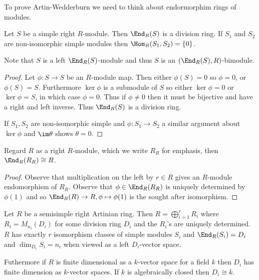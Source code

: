 \documentclass[a4paper]{article}
\begin{document}
To prove Artin-Wedderburn we need to think about endormorphim rings of modules.

\begin{lemma}
  Let \(S\) be a simple right \(R\)-module. Then \(\End_R(S)\) is a division ring. If \(S_1\) and \(S_2\) are non-isomorphic simple modules then \(\Hom_R(S_1, S_2) = \{0\}\).
\end{lemma}

Note that \(S\) is a left \(\End_R(S)\)-module and thus \(S\) is an \((\End_R(S), R)\)-bimodule.

\begin{proof}
  Let \(\phi: S \to S\) be an \(R\)-module map. Then either \(\phi(S) = 0\) so \(\phi = 0\), or \(\phi(S) = S\). Furthermore \(\ker \phi\) is a submodule of \(S\) so either \(\ker \phi = 0\) or \(\ker \phi = S\), in which case \(\phi = 0\). Thus if \(\phi \neq 0\) then it must be bijective and have a right and left inverse. Thus \(\End_R(S)\) is a division ring.

  If \(S_1, S_2\) are non-isomorphic simple and \(\phi: S_1 \to S_2\) a similar argument about \(\ker \phi\) and \(\im \theta\) shows \(\theta = 0\).
\end{proof}

\begin{lemma}
  Regard \(R\) as a right \(R\)-module, which we write \(R_R\) for emphasis, then \(\End_R(R_R) \cong R\).
\end{lemma}

\begin{proof}
  Observe that multiplication on the left by \(r \in R\) gives an \(R\)-module endomorphism of \(R_R\). Observe that \(\phi \in \End_R(R_R)\) is uniquely determined by \(\phi(1)\) and so \(\End_R(R) \to R, \phi \mapsto \phi(1)\) is the sought after isomorphism.
\end{proof}

\begin{theorem}
  \label{thm:Artin-Wedderburn}
  Let \(R\) be a semisimple right Artinian ring. Then \(R = \bigoplus_{i = 1}^r R_i\) where \(R_i = M_{n_i}(D_i)\) for some division ring \(D_i\) and the \(R_i\)'s are uniquely determined. \(R\) has exactly \(r\) isomorphism classes of simple modules \(S_i\) and \(\End_R(S_i) = D_i\) and \(\dim_{D_i} S_i = n_i\) when viewed as a left \(D_i\)-vector space.

  Futhermore if \(R\) is finite dimensional as a \(k\)-vector space for a field \(k\) then \(D_i\) has finite dimension as \(k\)-vector spaces. If \(k\) is algebraically closed then \(D_i \cong k\).
\end{theorem}
\end{document}
